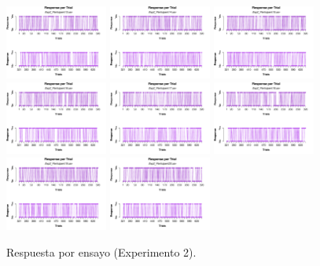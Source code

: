 \begin{figure}[th]
\includegraphics[width=0.30\textwidth]{Figures/Response_Exp2_P13} \includegraphics[width=0.30\textwidth]{Figures/Response_Exp2_P14} \includegraphics[width=0.30\textwidth]{Figures/Response_Exp2_P15}
\includegraphics[width=0.30\textwidth]{Figures/Response_Exp2_P16} \includegraphics[width=0.30\textwidth]{Figures/Response_Exp2_P17} \includegraphics[width=0.30\textwidth]{Figures/Response_Exp2_P18}
\includegraphics[width=0.30\textwidth]{Figures/Response_Exp2_P19} \includegraphics[width=0.30\textwidth]{Figures/Response_Exp2_P20} 
\caption[Response_Exp2]{Respuesta por ensayo (Experimento 2).}
\label{fig:Response_E2}
\end{figure}



